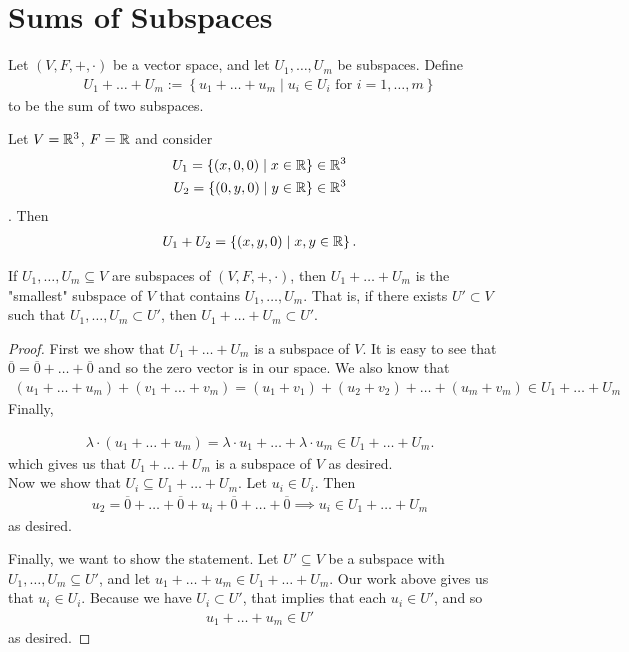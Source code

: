 \documentclass{memoir}
\begin{document}
\section{Sums of Subspaces}
Let $(V,F,+,\cdot )$ be a vector space, and let $U_1,\ldots,U_m$ be subspaces. Define 
\begin{align*}
	U_1 +\ldots+U_m := \left\{ u_1+\ldots+u_m \mid u_i \in U_i \text{ for } i=1,\ldots,m \right\}
\end{align*}
to be the sum of two subspaces.

\begin{exmp}
Let $V = \mathbb{R}^{3}$, $F=\mathbb{R}$ and consider
\begin{align*}
	U_1 = \left\{ (x,0,0) \mid x\in \mathbb{R} \right\} \in \mathbb{R}^{3}\\
	U_2 = \left\{ (0,y,0) \mid y \in \mathbb{R} \right\} \in \mathbb{R}^{3}
\end{align*}. Then
\begin{align*}
	U_1 + U_2 = \left\{ (x,y,0) \mid x,y\in \mathbb{R} \right\} .
\end{align*}
\end{exmp}

\begin{thm}
	If $U_1,\ldots,U_m \subseteq V$ are subspaces of $(V,F,+,\cdot )$, then $U_1+\ldots+U_m$ is the "smallest" subspace of $V$ that contains $U_1,\ldots,U_m$. That is, if there exists \(U'\subset V\) such that \(U_1,\ldots,U_m\subset U'\), then \(U_1+\ldots+U_m \subset U'\).
\end{thm}
\begin{proof}
	First we show that $U_1 + \ldots + U_m$ is a subspace of $V$. It is easy to see that $\overline{0} = \overline{0}+\ldots+\overline{0}$ and so the zero vector is in our space. We also know that
	\begin{align*}
		(u_1+\ldots+u_m) + (v_1+\ldots+v_m) = (u_1+v_1)+(u_2+v_2)+\ldots+(u_m+v_m) \in U_1+\ldots+U_m
	\end{align*}
	Finally, 

	\begin{align*}
		\lambda \cdot (u_1+\ldots+u_m) = \lambda \cdot u_1 + \ldots + \lambda \cdot u_m \in U_1 + \ldots+U_m.
	\end{align*}
	which gives us that \(U_1+\ldots+U_m\) is a subspace of \(V\) as desired.\\

	Now we show that $U_i \subseteq U_1 + \ldots + U_m$. Let $u_i \in U_i.$ Then 
	\begin{align*}
		u_2 = \overline{0} + \ldots + \overline{0} + u_i + \overline{0} + \ldots + \overline{0} \implies u_i \in U_1 + \ldots + U_m
	\end{align*}
	as desired.

Finally, we want to show the statement. Let $U' \subseteq V$ be a subspace with $U_1,\ldots,U_m \subseteq U'$, and let $u_1+\ldots+u_m \in U_1+\ldots+U_m$. Our work above gives us that $u_i \in U_i$. Because we have \(U_i \subset U'\), that implies that each \(u_i \in U'\), and so
\begin{align*}
	u_1 + \ldots+ u_m \in U'
\end{align*}
as desired.
\end{proof}
\end{document}
